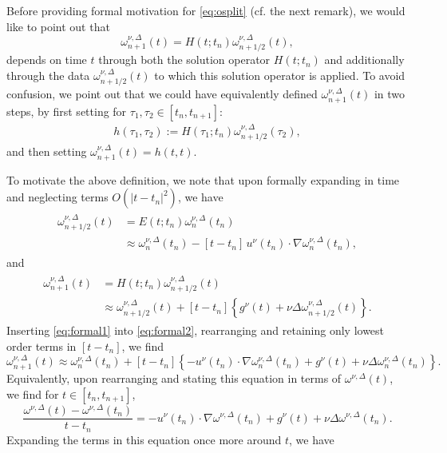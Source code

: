 \documentclass[reqno,12pt]{amsart}
\begin{document}
Before providing formal motivation for \eqref{eq:osplit} (cf. the next remark), we would like to point out that
\[
\omega^{\nu,\Delta}_{n+1}(t) = H(t;t_{n}) \omega^{\nu,\Delta}_{n+1/2}(t),
\]
depends on time $t$ through both the solution operator $H(t;t_n)$ and additionally through the  data $\omega^{\nu,\Delta}_{n+1/2}(t)$ to which this solution operator is applied. To avoid confusion, we point out that we could have equivalently defined $\omega^{\nu,\Delta}_{n+1}(t)$ in two steps, by first setting for $\tau_1,\tau_2 \in [t_n,t_{n+1}]$:
\begin{align}
\label{eq:h}
h(\tau_1,\tau_2) := H(\tau_1; t_n) \omega^{\nu,\Delta}_{n+1/2}(\tau_2),
\end{align}
and then setting $\omega^{\nu,\Delta}_{n+1}(t) = h(t,t)$.

\begin{remark}
To motivate the above definition, we note that upon formally expanding in time and neglecting terms $O(|t-t_n|^2)$, we have
\begin{align}
\label{eq:formal1}
\begin{aligned}
\omega^{\nu,\Delta}_{n+1/2}(t)
&= E(t;t_n) \omega^{\nu,\Delta}_{n}(t_{n})
\\
&\approx \omega^{\nu,\Delta}_{n}(t_{n}) - [t-t_n] \, u^\nu(t_n) \cdot \nabla  \omega^{\nu,\Delta}_{n}(t_{n}),
\end{aligned}
\end{align}
and
\begin{align}
\label{eq:formal2}
\begin{aligned}
\omega^{\nu,\Delta}_{n+1}(t)
&= H(t;t_n) \omega^{\nu,\Delta}_{n+1/2}(t)
\\
&\approx
\omega^{\nu,\Delta}_{n+1/2}(t) + [t-t_n] \left\{ g^\nu(t) + \nu \Delta \omega^{\nu,\Delta}_{n+1/2}(t) \right\}.
\end{aligned}
\end{align}
Inserting \eqref{eq:formal1} into \eqref{eq:formal2}, rearranging and retaining only lowest order terms in $[t-t_n]$, we find
\[
\omega^{\nu,\Delta}_{n+1}(t)
\approx
\omega^{\nu,\Delta}_{n}(t_n)
+ [t-t_n] \left\{ -u^\nu(t_n) \cdot \nabla  \omega^{\nu,\Delta}_{n}(t_{n})
+ g^\nu(t)
+ \nu \Delta \omega^{\nu,\Delta}_{n}(t_n)  \right\}.
\]
Equivalently, upon rearranging and stating this equation in terms of $\omega^{\nu,\Delta}(t)$, we find for $t\in [t_n,t_{n+1}]$,
\[
\frac{\omega^{\nu,\Delta}(t) - \omega^{\nu,\Delta}(t_n)}{t-t_n}
= -u^\nu(t_n) \cdot \nabla  \omega^{\nu,\Delta}(t_{n})
+ g^\nu(t)
+ \nu \Delta \omega^{\nu,\Delta}(t_n).
\]
Expanding the terms in this equation once more around $t$, we have

\end{remark}
\end{document}
